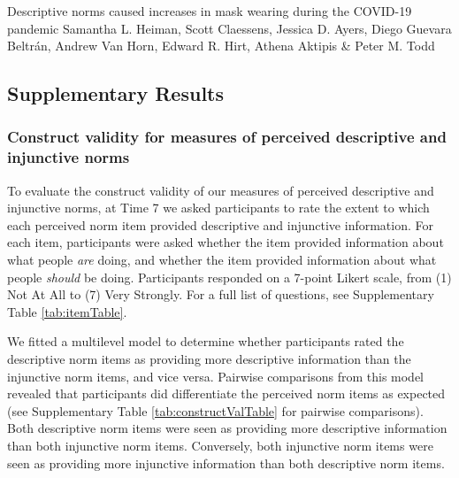 \documentclass[
  man, donotrepeattitle,floatsintext]{apa6}
\begin{document}
\setcounter{page}{1}
\small
\centering
\setlength\parindent{8mm}

Descriptive norms caused increases in mask wearing during the COVID-19 pandemic \newline
\hspace*{8mm} Samantha L. Heiman, Scott Claessens, Jessica D. Ayers, Diego Guevara Beltrán,\newline
\hspace*{8mm} Andrew Van Horn, Edward R. Hirt, Athena Aktipis \& Peter M. Todd \newline
\normalsize

\raggedright
\setlength{\parindent}{40pt}
\newpage

\hypertarget{supplementary-results}{%
\subsection{Supplementary Results}\label{supplementary-results}}

\hypertarget{construct-validity-for-measures-of-perceived-descriptive-and-injunctive-norms}{%
\subsubsection{Construct validity for measures of perceived descriptive and injunctive norms}\label{construct-validity-for-measures-of-perceived-descriptive-and-injunctive-norms}}

To evaluate the construct validity of our measures of perceived descriptive and injunctive norms, at Time 7 we asked participants to rate the extent to which each perceived norm item provided descriptive and injunctive information. For each item, participants were asked whether the item provided information about what people \emph{are} doing, and whether the item provided information about what people \emph{should} be doing. Participants responded on a 7-point Likert scale, from (1) Not At All to (7) Very Strongly. For a full list of questions, see Supplementary Table \ref{tab:itemTable}.

We fitted a multilevel model to determine whether participants rated the descriptive norm items as providing more descriptive information than the injunctive norm items, and vice versa. Pairwise comparisons from this model revealed that participants did differentiate the perceived norm items as expected (see Supplementary Table \ref{tab:constructValTable} for pairwise comparisons). Both descriptive norm items were seen as providing more descriptive information than both injunctive norm items. Conversely, both injunctive norm items were seen as providing more injunctive information than both descriptive norm items.
\end{document}
